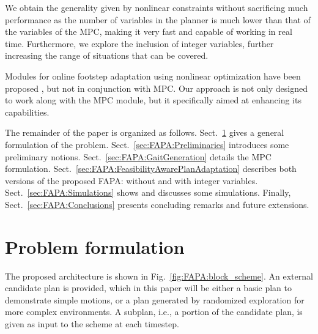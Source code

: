 We obtain the generality given by nonlinear constraints without sacrificing much performance as the number of variables in the planner is much lower than that of the variables of the MPC, making it very fast and capable of working in real time. Furthermore, we explore the inclusion of integer variables, further increasing the range of situations that can be covered.

Modules for online footstep adaptation using nonlinear optimization have been proposed \cite{Ding2019IROS}, but not in conjunction with MPC. Our approach is not only designed to work along with the MPC module, but it specifically aimed at enhancing its capabilities.

The remainder of the paper is organized as follows. Sect.~\ref{sec:FAPA:ProblemFormulation} gives a general formulation of the problem. Sect.~\ref{sec:FAPA:Preliminaries} introduces some preliminary notions. Sect.~\ref{sec:FAPA:GaitGeneration} details the MPC formulation. Sect.~\ref{sec:FAPA:FeasibilityAwarePlanAdaptation} describes both versions of the proposed FAPA: without and with integer variables. Sect.~\ref{sec:FAPA:Simulations} shows and discusses some simulations. Finally, Sect.~\ref{sec:FAPA:Conclusions} presents concluding remarks and future extensions.

\section{Problem formulation} 
\label{sec:FAPA:ProblemFormulation}



The proposed architecture is shown in Fig.~\ref{fig:FAPA:block_scheme}. An external candidate plan is provided, which in this paper will be either a basic plan to demonstrate simple motions, or a plan generated by randomized exploration \cite{Cipriano2023RAS} for more complex environments. A subplan, i.e., a portion of the candidate plan, is given as input to the scheme at each timestep.

